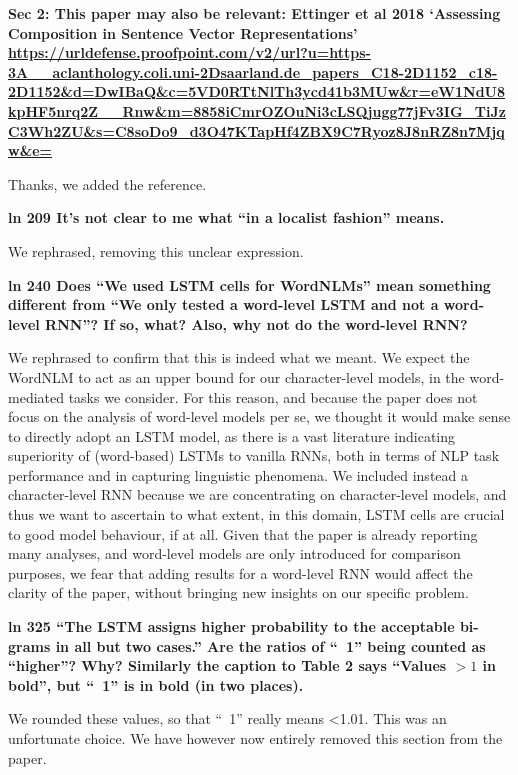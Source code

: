 \documentclass{article}[11pt,a4paper,oneside]
\begin{document}
\textbf{Sec 2: This paper may also be relevant: Ettinger et al 2018 `Assessing Composition in Sentence Vector Representations'
\url{https://urldefense.proofpoint.com/v2/url?u=https-3A__aclanthology.coli.uni-2Dsaarland.de_papers_C18-2D1152_c18-2D1152&d=DwIBaQ&c=5VD0RTtNlTh3ycd41b3MUw&r=eW1NdU8kpHF5nrq2Z__Rnw&m=8858iCmrOZOuNi3cLSQjugg77jFv3IG_TiJzC3Wh2ZU&s=C8soDo9_d3O47KTapHf4ZBX9C7Ryoz8J8nRZ8n7Mjqw&e=}}

Thanks, we added the reference.
\newline

\textbf{ln 209 It's not clear to me what ``in a localist fashion'' means.}

We rephrased, removing this unclear expression.
\newline

\textbf{ln 240 Does ``We used LSTM cells for WordNLMs'' mean something different from ``We only tested a word-level LSTM and not a word-level RNN''? If so, what?  Also, why not do the word-level RNN?}

We rephrased to confirm that this is indeed what we meant. We expect the WordNLM to act as an upper bound for our character-level models, in the word-mediated tasks we consider. For this reason, and because the paper does not focus on the analysis of word-level models per se, we thought it would make sense to directly adopt an LSTM model, as there is a vast literature indicating superiority of (word-based) LSTMs to vanilla RNNs, both in terms of NLP task performance and in capturing linguistic phenomena. We included instead a character-level RNN because we are concentrating on character-level models, and thus we want to ascertain to what extent, in this domain, LSTM cells are crucial to good model behaviour, if at all. Given that the paper is already reporting many analyses, and word-level models are only introduced for comparison purposes, we fear that adding results for a word-level RNN would affect the clarity of the paper, without bringing new insights on our specific problem.
\newline

\textbf{ln 325 ``The LSTM assigns higher probability to the acceptable bi-grams in all but two cases.'' Are the ratios of ``~1'' being counted as ``higher''? Why?  Similarly the caption to Table 2 says ``Values $> 1$ in bold'', but ``~1'' is in bold (in two places).}

We rounded these values, so that ``~1'' really means <1.01. This was an unfortunate choice. We have however now entirely removed this section from the paper.
\newline
\end{document}
